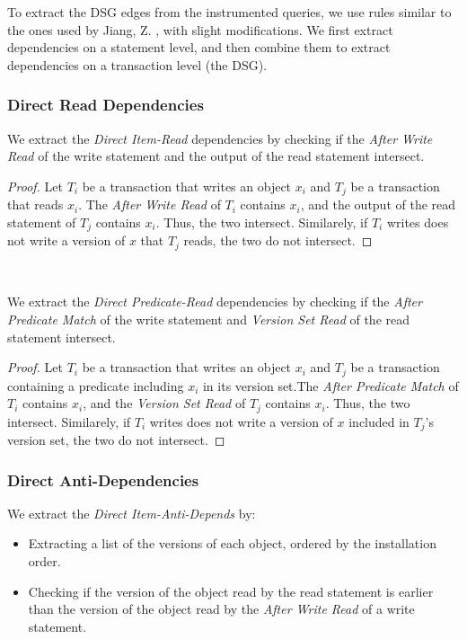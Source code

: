 To extract the DSG edges from the instrumented queries, we use rules similar to the ones used by Jiang, Z. \cite{jiang2023detecting}, with slight modifications. We first extract dependencies on a statement level, and then combine them to extract dependencies on a transaction level (the DSG).

\subsubsection{Direct Read Dependencies}

We extract the \textit{Direct Item-Read} dependencies by checking if the \textit{After Write Read} of the write statement and the output of the read statement intersect.

\begin{proof}
    Let $T_i$ be a transaction that writes an object $x_i$ and $T_j$ be a transaction that reads $x_i$. The \textit{After Write Read} of $T_i$ contains $x_i$, and the output of the read statement of $T_j$ contains $x_i$. Thus, the two intersect. Similarely, if $T_i$ writes does not write a version of $x$ that $T_j$ reads, the two do not intersect.
\end{proof}

\

We extract the \textit{Direct Predicate-Read} dependencies by checking if the \textit{After Predicate Match} of the write statement and \textit{Version Set Read} of the read statement intersect.

\begin{proof}
    Let $T_i$ be a transaction that writes an object $x_i$ and $T_j$ be a transaction containing a predicate including $x_i$ in its version set.The \textit{After Predicate Match} of $T_i$ contains $x_i$, and the \textit{Version Set Read} of $T_j$ contains $x_i$. Thus, the two intersect. Similarely, if $T_i$ writes does not write a version of $x$ included in $T_j$'s version set, the two do not intersect.
\end{proof}

\subsubsection{Direct Anti-Dependencies}

We extract the \textit{Direct Item-Anti-Depends} by:
\begin{itemize}
    \item Extracting a list of the versions of each object, ordered by the installation order.
    \item Checking if the version of the object read by the read statement is earlier than the version of the object read by the \textit{After Write Read} of a write statement.
\end{itemize}


